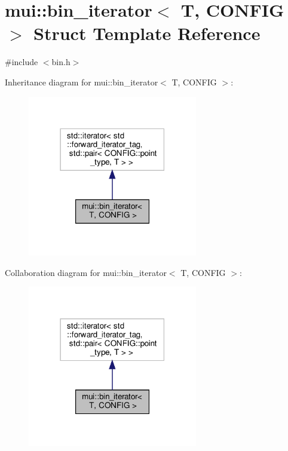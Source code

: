 \hypertarget{structmui_1_1bin__iterator}{}\section{mui\+:\+:bin\+\_\+iterator$<$ T, C\+O\+N\+F\+IG $>$ Struct Template Reference}
\label{structmui_1_1bin__iterator}


{\ttfamily \#include $<$bin.\+h$>$}



Inheritance diagram for mui\+:\+:bin\+\_\+iterator$<$ T, C\+O\+N\+F\+IG $>$\+:
\nopagebreak
\begin{figure}[H]
\begin{center}
\leavevmode
\includegraphics[width=210pt]{structmui_1_1bin__iterator__inherit__graph}
\end{center}
\end{figure}


Collaboration diagram for mui\+:\+:bin\+\_\+iterator$<$ T, C\+O\+N\+F\+IG $>$\+:
\nopagebreak
\begin{figure}[H]
\begin{center}
\leavevmode
\includegraphics[width=210pt]{structmui_1_1bin__iterator__coll__graph}
\end{center}
\end{figure}
